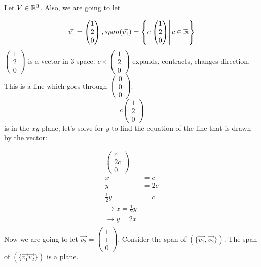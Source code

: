   \begin{problem}
    Let $V\in\mathbb{R}^3$. Also, we are going to let

    \[
      \vec{v_1}=\begin{pmatrix}
        1\\2\\0
      \end{pmatrix}
      ,span(\vec{v_1})=\left\{c\left.\begin{pmatrix}1\\2\\0\end{pmatrix}\right|c\in\mathbb{R}\right\}
    \]
    $\left(\begin{smallmatrix}1\\2\\0\end{smallmatrix}\right)$ is a vector in 3-space. $c\times\left(\begin{smallmatrix}1\\2\\0\end{smallmatrix}\right)$ expands, contracts, changes direction. This is a line which goes through $\left(\begin{smallmatrix}0\\0\\0\end{smallmatrix}\right)$.
    \[
      c\begin{pmatrix}
        1\\2\\0 
      \end{pmatrix}
    \]
    is in the $xy$-plane, let's solve for $y$ to find the equation of the line that is drawn by the vector:

    \begin{align*}
      \begin{pmatrix}
        c\\2c\\0
      \end{pmatrix}\\
      x&=c\\
      y&=2c\\
      \frac{1}{2}y&=c\\
      \to x=\frac{1}{2}y\\
      \to y=2x\\
    \end{align*}
    Now we are going to let $\vec{v_2}=\left(\begin{smallmatrix}1\\1\\0\end{smallmatrix}\right)$. Consider the span of $(\{\vec{v_1},\vec{v_2}\})$. The span of $(\{\vec{v_1}\vec{v_2}\})$ is a plane.
  \end{problem}

